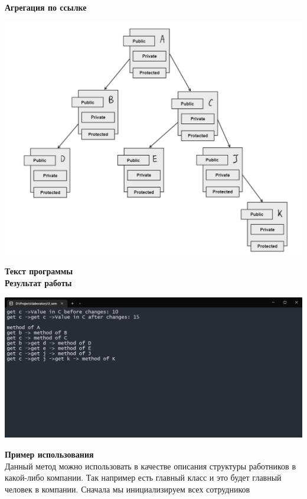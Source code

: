 \documentclass[12pt]{report}
\begin{document}
    \textbf{\large{Агрегация по ссылке}}\\
    \begin{center}
        \includegraphics[scale=0.5]{formal/screen_2.png}\\
    \end{center}
    \textbf{Текст программы}\\
    
    \vspace{0.4in}
    \textbf{Результат работы}\\
    \begin{center}
        \includegraphics[scale=0.5]{formal/screen_1.png}\\
    \end{center}
    \textbf{Пример использования}\\
    Данный метод можно использовать в качестве описания структуры работников в какой-либо компании. 
    Так например есть главный класс и это будет главный человек в компании. Сначала мы инициализируем всех сотрудников 
\end{document}
